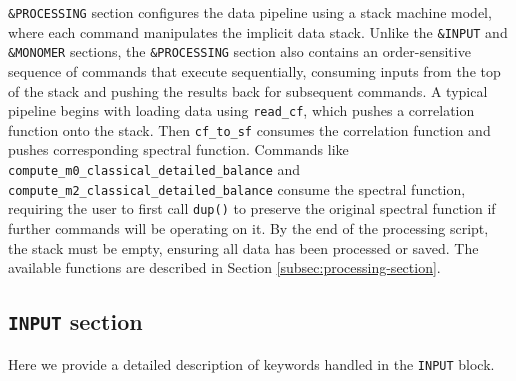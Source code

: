 \documentclass[color]{article}
\begin{document}
\noindent
\texttt{\&PROCESSING} section configures the data pipeline using a stack machine model, where each command manipulates the implicit data stack. Unlike the \texttt{\&INPUT} and \texttt{\&MONOMER} sections, the \texttt{\&PROCESSING} section also contains an order-sensitive sequence of commands that execute sequentially, consuming inputs from the top of the stack and pushing the results back for subsequent commands. A typical pipeline begins with loading data using \texttt{read\_cf}, which pushes a correlation function onto the stack. Then \texttt{cf\_to\_sf} consumes the correlation function and pushes corresponding spectral function. Commands like \texttt{compute\_m0\_classical\_detailed\_balance} and \texttt{compute\_m2\_classical\_detailed\_balance} consume the spectral function, requiring the user to first call \texttt{dup()} to preserve the original spectral function if further commands will be operating on it. By the end of the processing script, the stack must be empty, ensuring all data has been processed or saved. The available functions are described in Section \ref{subsec:processing-section}. \\

\subsection{\texttt{INPUT} section}
\label{subsec:input-section}

Here we provide a detailed description of keywords handled in the \texttt{INPUT} block.
\end{document}
